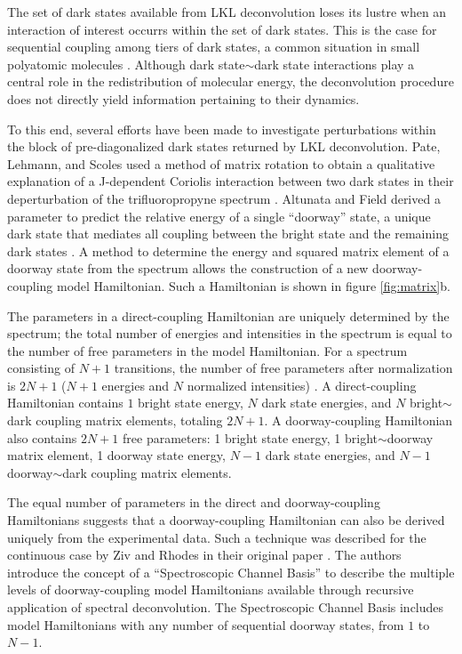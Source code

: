 \documentclass[12pt]{mitthesis}
\begin{document}
The set of dark states available from LKL deconvolution loses its
lustre when an interaction of interest occurrs within the set of dark
states.  This is the case for sequential coupling among tiers of dark
states, a common situation in small polyatomic molecules
\cite{tramer05}.  Although dark state$\sim$dark state interactions
play a central role in the redistribution of molecular energy, the
deconvolution procedure does not directly yield information pertaining
to their dynamics.

To this end, several efforts have been made to investigate
perturbations within the block of pre-diagonalized dark states
returned by LKL deconvolution.  Pate, Lehmann, and Scoles used a
method of matrix rotation to obtain a qualitative explanation of a
J-dependent Coriolis interaction between two dark states in their
deperturbation of the trifluoropropyne spectrum \cite{pate91}.
Altunata and Field derived a parameter to predict the relative energy
of a single ``doorway'' state, a unique dark state that mediates all
coupling between the bright state and the remaining dark states
\cite{altunata01}.  A method to determine the energy and squared
matrix element of a doorway state from the spectrum allows the
construction of a new doorway-coupling model Hamiltonian.  Such a
Hamiltonian is shown in figure \ref{fig:matrix}b.

The parameters in a direct-coupling Hamiltonian are uniquely
determined by the spectrum; the total number of energies and
intensities in the spectrum is equal to the number of free parameters
in the model Hamiltonian.  For a spectrum consisting of $N+1$
transitions, the number of free parameters after normalization is
$2N+1$ ($N+1$ energies and $N$ normalized intensities)
\cite{lawrance85}.  A direct-coupling Hamiltonian contains $1$ bright
state energy, $N$ dark state energies, and $N$ bright$\sim$dark
coupling matrix elements, totaling $2N+1$.  A doorway-coupling
Hamiltonian also contains $2N+1$ free parameters: 1 bright state
energy, 1 bright$\sim$doorway matrix element, 1 doorway state energy,
$N-1$ dark state energies, and $N-1$ doorway$\sim$dark coupling matrix
elements.

The equal number of parameters in the direct and doorway-coupling
Hamiltonians suggests that a doorway-coupling Hamiltonian can also be
derived uniquely from the experimental data.  Such a technique was
described for the continuous case by Ziv and Rhodes in their original
paper \cite{ziv76}.  The authors introduce the concept of a
``Spectroscopic Channel Basis'' to describe the multiple levels of
doorway-coupling model Hamiltonians available through recursive
application of spectral deconvolution.  The Spectroscopic Channel
Basis includes model Hamiltonians with any number of sequential
doorway states, from $1$ to $N-1$.
\end{document}
